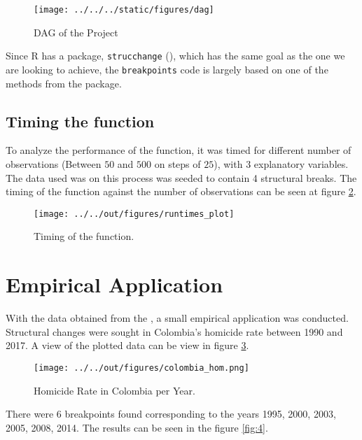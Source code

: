 \documentclass[11pt, a4paper, leqno]{article}
\begin{document}
\begin{figure}[h]

    \texttt{[image: ../../../static/figures/dag]}
    \caption{DAG of the Project}
    \label{fig:1}

\end{figure}

Since R has a package, \texttt{strucchange} (\citealt{zeileis2019strucchange}), which has the same goal as the one we are looking to achieve, the \texttt{breakpoints} code is largely based on one of the methods from the package.

\subsection{Timing the function}

To analyze the performance of the function, it was timed for different number of observations (Between $50$ and $500$ on steps of $25$), with $3$ explanatory variables.  The data used was on this process was seeded to contain 4 structural breaks. The timing of the function against the number of observations can be seen at figure \ref{fig:2}.

\begin{figure}[h]

    \texttt{[image: ../../out/figures/runtimes\_plot]}
    \caption{Timing of the function.}
    \label{fig:2}

\end{figure}


\section{Empirical Application}
\label{sec:empirical}

With the data obtained from the \cite{world2017homicides}, a small empirical application was conducted. Structural changes were sought in Colombia's homicide rate between 1990 and 2017. A view of the plotted data can be view in figure \ref{fig:3}.

\begin{figure}[ht]
    \centering
    \texttt{[image: ../../out/figures/colombia\_hom.png]}
    \caption{Homicide Rate in Colombia per Year.}
    \label{fig:3}

\end{figure}

There were 6 breakpoints found corresponding to the years 1995, 2000, 2003, 2005, 2008, 2014.  The results can be seen in the figure \ref{fig:4}.
\end{document}
